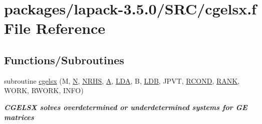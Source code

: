 \hypertarget{cgelsx_8f}{}\section{packages/lapack-\/3.5.0/\+S\+R\+C/cgelsx.f File Reference}
\label{cgelsx_8f}
\subsection*{Functions/\+Subroutines}
\begin{DoxyCompactItemize}
\item 
subroutine \hyperlink{group__complexGEsolve_ga3c220cf53bd0e63da90633205a6b1db2}{cgelsx} (M, \hyperlink{polmisc_8c_a0240ac851181b84ac374872dc5434ee4}{N}, \hyperlink{example__user_8c_aa0138da002ce2a90360df2f521eb3198}{N\+R\+H\+S}, \hyperlink{classA}{A}, \hyperlink{example__user_8c_ae946da542ce0db94dced19b2ecefd1aa}{L\+D\+A}, B, \hyperlink{example__user_8c_a50e90a7104df172b5a89a06c47fcca04}{L\+D\+B}, J\+P\+V\+T, \hyperlink{superlu__enum__consts_8h_af00a42ecad444bbda75cde1b64bd7e72a9b5c151728d8512307565994c89919d5}{R\+C\+O\+N\+D}, \hyperlink{splinemodule_8c_a3a88bcc63386de30443dacede2e01847}{R\+A\+N\+K}, W\+O\+R\+K, R\+W\+O\+R\+K, I\+N\+F\+O)
\begin{DoxyCompactList}\small\item\em {\bfseries  C\+G\+E\+L\+S\+X solves overdetermined or underdetermined systems for G\+E matrices} \end{DoxyCompactList}\end{DoxyCompactItemize}
